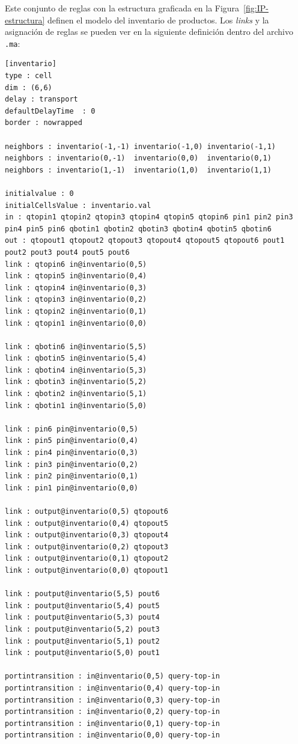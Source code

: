 \documentclass[10pt]{article}
\begin{document}
Este conjunto de reglas con la estructura graficada en la Figura~\ref{fig:IP-estructura} definen el modelo del inventario de productos. Los \textit{links} y la asignación de reglas se pueden ver en la siguiente definición dentro del archivo \texttt{.ma}:

\begin{minipage}{1\textwidth}
	\centering
	\begin{lstlisting}
[inventario]
type : cell
dim : (6,6)
delay : transport
defaultDelayTime  : 0
border : nowrapped

neighbors : inventario(-1,-1) inventario(-1,0) inventario(-1,1)
neighbors : inventario(0,-1)  inventario(0,0)  inventario(0,1)
neighbors : inventario(1,-1)  inventario(1,0)  inventario(1,1)

initialvalue : 0
initialCellsValue : inventario.val
in : qtopin1 qtopin2 qtopin3 qtopin4 qtopin5 qtopin6 pin1 pin2 pin3 pin4 pin5 pin6 qbotin1 qbotin2 qbotin3 qbotin4 qbotin5 qbotin6
out : qtopout1 qtopout2 qtopout3 qtopout4 qtopout5 qtopout6 pout1 pout2 pout3 pout4 pout5 pout6
link : qtopin6 in@inventario(0,5)
link : qtopin5 in@inventario(0,4)
link : qtopin4 in@inventario(0,3)
link : qtopin3 in@inventario(0,2)
link : qtopin2 in@inventario(0,1)
link : qtopin1 in@inventario(0,0)

link : qbotin6 in@inventario(5,5)
link : qbotin5 in@inventario(5,4)
link : qbotin4 in@inventario(5,3)
link : qbotin3 in@inventario(5,2)
link : qbotin2 in@inventario(5,1)
link : qbotin1 in@inventario(5,0)

link : pin6 pin@inventario(0,5)
link : pin5 pin@inventario(0,4)
link : pin4 pin@inventario(0,3)
link : pin3 pin@inventario(0,2)
link : pin2 pin@inventario(0,1)
link : pin1 pin@inventario(0,0)

link : output@inventario(0,5) qtopout6
link : output@inventario(0,4) qtopout5
link : output@inventario(0,3) qtopout4
link : output@inventario(0,2) qtopout3
link : output@inventario(0,1) qtopout2
link : output@inventario(0,0) qtopout1

link : poutput@inventario(5,5) pout6
link : poutput@inventario(5,4) pout5
link : poutput@inventario(5,3) pout4
link : poutput@inventario(5,2) pout3
link : poutput@inventario(5,1) pout2
link : poutput@inventario(5,0) pout1

portintransition : in@inventario(0,5) query-top-in
portintransition : in@inventario(0,4) query-top-in
portintransition : in@inventario(0,3) query-top-in
portintransition : in@inventario(0,2) query-top-in
portintransition : in@inventario(0,1) query-top-in
portintransition : in@inventario(0,0) query-top-in


\end{lstlisting}
\end{minipage}
\end{document}
